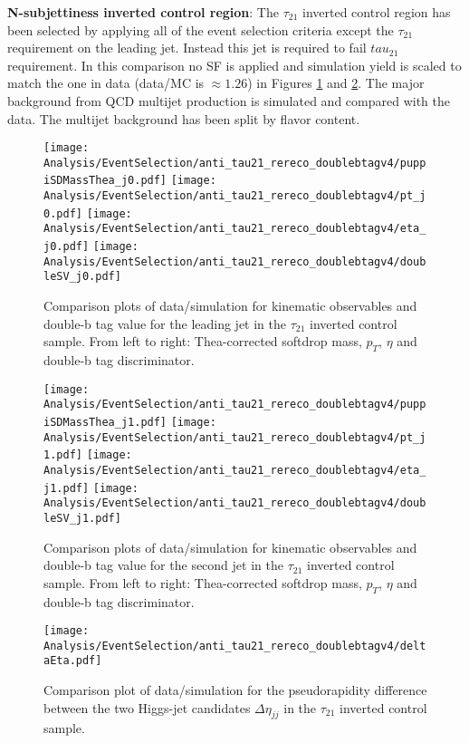 \noindent
\textbf{N-subjettiness inverted control region}:
The $\tau_{21}$ inverted control region has been selected by applying all of the event selection criteria except the $\tau_{21}$ requirement on the leading jet. Instead this jet is required to fail $tau_{21}$ requirement.
In this comparison no SF is applied and simulation yield is scaled to match the one in data (data/MC is $\approx 1.26$) in Figures \ref{fig:jet1_tau_inverted} and \ref{fig:jet2_tau_inverted}.
The major background from QCD multijet production is simulated and compared with the data. The multijet background has been split by flavor content.

\begin{figure}[H]
\centering
\texttt{[image: Analysis/EventSelection/anti\_tau21\_rereco\_doublebtagv4/puppiSDMassThea\_j0.pdf]}
\texttt{[image: Analysis/EventSelection/anti\_tau21\_rereco\_doublebtagv4/pt\_j0.pdf]}
\texttt{[image: Analysis/EventSelection/anti\_tau21\_rereco\_doublebtagv4/eta\_j0.pdf]}
\texttt{[image: Analysis/EventSelection/anti\_tau21\_rereco\_doublebtagv4/doubleSV\_j0.pdf]}
\caption{ Comparison plots of data/simulation for kinematic observables and double-b tag value for the leading jet in the $\tau_{21}$ inverted control sample. From left to right: Thea-corrected softdrop mass, $p_{T}$, $\eta$ and double-b tag discriminator.}
\label{fig:jet1_tau_inverted}
\end{figure}

\begin{figure}[H]
\centering
\texttt{[image: Analysis/EventSelection/anti\_tau21\_rereco\_doublebtagv4/puppiSDMassThea\_j1.pdf]}
\texttt{[image: Analysis/EventSelection/anti\_tau21\_rereco\_doublebtagv4/pt\_j1.pdf]}
\texttt{[image: Analysis/EventSelection/anti\_tau21\_rereco\_doublebtagv4/eta\_j1.pdf]}
\texttt{[image: Analysis/EventSelection/anti\_tau21\_rereco\_doublebtagv4/doubleSV\_j1.pdf]}
\caption{ Comparison plots of data/simulation for kinematic observables and double-b tag value for the second jet in the $\tau_{21}$ inverted control sample. From left to right: Thea-corrected softdrop mass, $p_{T}$, $\eta$ and double-b tag discriminator.}
\label{fig:jet2_tau_inverted}
\end{figure}


\begin{figure}[H]
\centering
\texttt{[image: Analysis/EventSelection/anti\_tau21\_rereco\_doublebtagv4/deltaEta.pdf]}
\caption{ Comparison plot of data/simulation for the pseudorapidity difference between the two Higgs-jet candidates $\Delta\eta_{jj}$ in the $\tau_{21}$ inverted control sample.}
\label{fig:deta_tau_inverted}
\end{figure}

